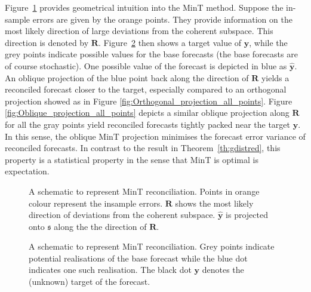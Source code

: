 \documentclass[12pt]{article}
\theoremstyle{definition}
\theoremstyle{property}
\begin{document}
	Figure~\ref{fig:MinT_justification1} provides geometrical intuition into the MinT method.  Suppose the in-sample errors are given by the orange points.  They provide information on the most likely direction of large deviations from the coherent subspace.  This direction is denoted by $\bm{R}$.  Figure~\ref{fig:MinT_justification2} then shows a target value of $\bm{y}$, while the grey points indicate possible values for the base forecasts (the base forecasts are of course stochastic).  One possible value of the forecast is depicted in blue as $\hat{\bm{y}}$.  An oblique projection of the blue point back along the direction of $\bm{R}$ yields a reconciled forecast closer to the target, especially compared to an orthogonal projection showed as in Figure \ref{fig:Orthogonal_projection_all_points}.  Figure \ref{fig:Oblique_projection_all_points} depicts a similar oblique projection along $\bm{R}$ for all the gray points yield reconciled forecasts tightly packed near the target $\bm{y}$.  In this sense, the oblique MinT projection minimises the forecast error variance of reconciled forecasts. In contrast to the result in Theorem~\ref{th:gdistred}, this property is a statistical property in the sense that MinT is optimal is expectation.
	
	\begin{figure}[H]
		\centering
		\small
		\resizebox{\linewidth}{!}{
			
		}
		\caption{A schematic to represent MinT reconciliation. Points in orange colour represent the insample errors. $\bm{R}$ shows the most likely direction of deviations from the coherent subspace. $\hat{\bm{y}}$ is projected onto $\mathfrak{s}$ along the the direction of $\bm{R}$.}\label{fig:MinT_justification1}
	\end{figure}
		
	\begin{figure}[H]
		\centering
		\small
		\resizebox{\linewidth}{!}{
			
		}
		\caption{A schematic to represent MinT reconciliation. Grey points indicate potential realisations of the base forecast while the blue dot indicates one such realisation. The black dot ${\bm y}$ denotes the (unknown) target of the forecast.}\label{fig:MinT_justification2}
	\end{figure}
	
\end{document}
